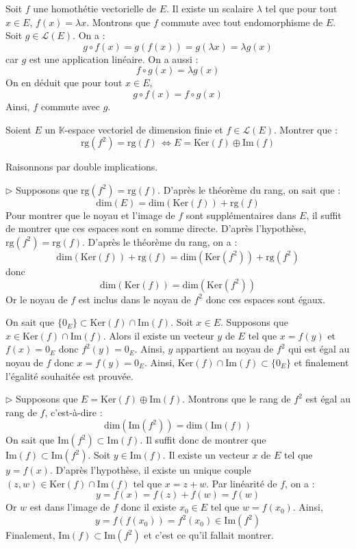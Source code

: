 \documentclass[a4paper,10pt]{report}
\begin{document}
\begin{enumerate}
\medskip

\noindent Soit $f$ une homothétie vectorielle de $E$. Il existe un scalaire $\lambda$ tel que pour tout $x \in E$, $f(x)= \lambda x$. Montrons que $f$ commute avec tout endomorphisme de $E$. Soit $g \in \mathcal{L}(E)$. On a :
$$ g \circ f(x) = g (f(x)) = g(\lambda x)= \lambda g(x)$$
car $g$ est une application linéaire. On a aussi :
$$ f \circ g(x) = \lambda g(x)$$
On en déduit que pour tout $x \in E$,
$$ g \circ f(x) = f \circ g(x)$$
Ainsi, $f$ commute avec $g$.
\end{enumerate}

\begin{Exa} Soient $E$ un $\mathbb{K}$-espace vectoriel de dimension finie et $f \in \mathcal{L}(E)$. Montrer que :
$$ \textrm{rg}(f^2 ) =  \textrm{rg}( f ) \, \Longleftrightarrow E = \textrm{Ker}(f) \oplus \textrm{Im}(f) $$
\end{Exa}

\corr Raisonnons par double implications.

\medskip

\noindent $\rhd$ Supposons que $\textrm{rg}(f^2 ) =  \textrm{rg}( f )$. D'après le théorème du rang, on sait que :
$$ \textrm{dim}(E) = \textrm{dim}( \textrm{Ker}(f)) + \textrm{rg}( f )$$
Pour montrer que le noyau et l'image de $f$ sont supplémentaires dans $E$, il suffit de montrer que ces espaces sont en somme directe. D'après l'hypothèse, $\textrm{rg}(f^2 ) =  \textrm{rg}( f )$. D'après le théorème du rang, on a :
$$ \textrm{dim}( \textrm{Ker}(f)) + \textrm{rg}( f ) = \textrm{dim}( \textrm{Ker}(f^2)) + \textrm{rg}( f^2)$$
donc 
$$ \textrm{dim}( \textrm{Ker}(f)) = \textrm{dim}( \textrm{Ker}(f^2))$$
Or le noyau de $f$ est inclus dans le noyau de $f^2$ donc ces espaces sont égaux.

\medskip

\noindent On sait que $\lbrace 0_E \rbrace \subset \textrm{Ker}(f) \cap \textrm{Im}(f)$. Soit $x \in E$. Supposons que $x \in \textrm{Ker}(f) \cap \textrm{Im}(f)$. Alors il existe un vecteur $y$ de $E$ tel que $x=f(y)$ et $f(x)=0_E$ donc $f^2(y)=0_E$. Ainsi, $y$ appartient au noyau de $f^2$ qui est égal au noyau de $f$ donc $x=f(y)=0_E$. Ainsi, $\textrm{Ker}(f) \cap \textrm{Im}(f) \subset \lbrace 0_E \rbrace$ et finalement l'égalité souhaitée est prouvée.


\medskip

\noindent $\rhd$ Supposons que $E = \textrm{Ker}(f) \oplus \textrm{Im}(f)$. Montrons que le rang de $f^2$ est égal au rang de $f$, c'est-à-dire :
$$ \textrm{dim}(\textrm{Im}(f^2)) = \textrm{dim}(\textrm{Im}(f))$$
On sait que $\textrm{Im}(f^2) \subset \textrm{Im}(f)$. Il suffit donc de montrer que $\textrm{Im}(f) \subset \textrm{Im}(f^2)$. Soit $y \in \textrm{Im}(f)$. Il existe un vecteur $x$ de $E$ tel que $y=f(x)$. D'après l'hypothèse, il existe un unique couple $(z,w) \in \textrm{Ker}(f) \cap \textrm{Im}(f)$ tel que $x=z+w$. Par linéarité de $f$, on a :
$$ y = f(x) = f(z)+f(w) = f(w)$$
Or $w$ est dans l'image de $f$ donc il existe $x_0 \in E$ tel que $w=f(x_0)$. Ainsi,
$$ y = f(f(x_0))= f^2(x_0) \in  \textrm{Im}(f^2)$$
Finalement, $\textrm{Im}(f) \subset \textrm{Im}(f^2)$ et c'est ce qu'il fallait montrer.
\end{document}
